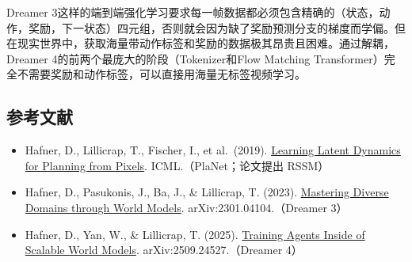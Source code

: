Dreamer 3这样的端到端强化学习要求每一帧数据都必须包含精确的（状态，动作，奖励，下一状态）四元组，否则就会因为缺了奖励预测分支的梯度而学偏。但在现实世界中，获取海量带动作标签和奖励的数据极其昂贵且困难。通过解耦，Dreamer 4的前两个最庞大的阶段（Tokenizer和Flow Matching Transformer）完全不需要奖励和动作标签，可以直接用海量无标签视频学习。

\FloatBarrier
{}
\hypertarget{ux53c2ux8003ux6587ux732e-156}{%
\subsection{参考文献}\label{ux53c2ux8003ux6587ux732e-156}}

\vspace{0.25em}
\begin{itemize}
\tightlist
\item
  Hafner, D., Lillicrap, T., Fischer, I., et al.~(2019). \href{https://arxiv.org/abs/1811.04551}{Learning Latent Dynamics for Planning from Pixels}. ICML.（PlaNet；论文提出 RSSM）
\item
  Hafner, D., Pasukonis, J., Ba, J., \& Lillicrap, T. (2023). \href{https://arxiv.org/abs/2301.04104}{Mastering Diverse Domains through World Models}. arXiv:2301.04104.（Dreamer 3）
\item
  Hafner, D., Yan, W., \& Lillicrap, T. (2025). \href{https://arxiv.org/abs/2509.24527}{Training Agents Inside of Scalable World Models}. arXiv:2509.24527.（Dreamer 4）
\end{itemize}

\clearpage

